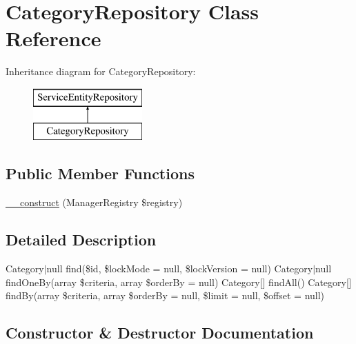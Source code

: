 \hypertarget{class_app_1_1_repository_1_1_category_repository}{}\section{Category\+Repository Class Reference}
\label{class_app_1_1_repository_1_1_category_repository}
Inheritance diagram for Category\+Repository\+:\begin{figure}[H]
\begin{center}
\leavevmode
\includegraphics[height=2.000000cm]{class_app_1_1_repository_1_1_category_repository}
\end{center}
\end{figure}
\subsection*{Public Member Functions}
\begin{DoxyCompactItemize}
\item 
\mbox{\hyperlink{class_app_1_1_repository_1_1_category_repository_a38ea33dde11163765f358f5f10a3bc03}{\+\_\+\+\_\+construct}} (Manager\+Registry \$registry)
\end{DoxyCompactItemize}


\subsection{Detailed Description}
Category$\vert$null find(\$id, \$lock\+Mode = null, \$lock\+Version = null)  Category$\vert$null find\+One\+By(array \$criteria, array \$order\+By = null)  Category\mbox{[}\mbox{]} find\+All()  Category\mbox{[}\mbox{]} find\+By(array \$criteria, array \$order\+By = null, \$limit = null, \$offset = null) 

\subsection{Constructor \& Destructor Documentation}
\mbox{\label{class_app_1_1_repository_1_1_category_repository_a38ea33dde11163765f358f5f10a3bc03}} 
